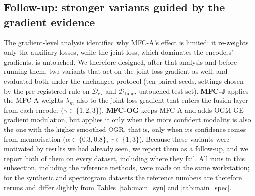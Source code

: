 \documentclass[fleqn,10pt]{wlscirep}
\begin{document}
\subsection*{Follow-up: stronger variants guided by the gradient evidence}
The gradient-level analysis identified why MFC-A's effect is limited: it re-weights only the auxiliary losses, while the joint loss, which dominates the encoders' gradients, is untouched. We therefore designed, after that analysis and before running them, two variants that act on the joint-loss gradient as well, and evaluated both under the unchanged protocol (ten paired seeds, settings chosen by the pre-registered rule on $\mathcal{D}_{\mathrm{cv}}$ and $\mathcal{D}_{\mathrm{tune}}$, untouched test set). \textbf{MFC-J} applies the MFC-A weights $\lambda_m$ also to the joint-loss gradient that enters the fusion layer from each encoder ($\gamma\in\{1,2,3\}$). \textbf{MFC-OG} keeps MFC-A and adds OGM-GE gradient modulation\cite{peng2022balanced}, but applies it only when the more confident modality is also the one with the higher smoothed OGR, that is, only when its confidence comes from memorisation ($\alpha\in\{0.3,0.8\}$, $\gamma\in\{1,3\}$). Because these variants were motivated by results we had already seen, we report them as a follow-up, and we report both of them on every dataset, including where they fail. All runs in this subsection, including the reference methods, were made on the same workstation; for the synthetic and spectrogram datasets the reference numbers are therefore reruns and differ slightly from Tables~\ref{tab:main_syn} and \ref{tab:main_spec}.
\end{document}
